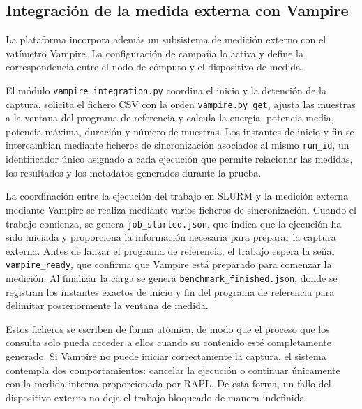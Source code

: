 \subsection{Integración de la medida externa con Vampire}
\label{subsec:vampire-implementacion}

La plataforma incorpora además un subsistema de medición externo con el vatímetro Vampire. La configuración de campaña lo activa y define la correspondencia entre el nodo de cómputo y el dispositivo de medida.

El módulo \texttt{vampire\_integration.py} coordina el inicio y la detención de la captura, solicita el fichero CSV con la orden \texttt{vampire.py get}, ajusta las muestras a la ventana del programa de referencia y calcula la energía, potencia media, potencia máxima, duración y número de muestras. Los instantes de inicio y fin se intercambian mediante ficheros de sincronización asociados al mismo \texttt{run\_id}, un identificador único asignado a cada ejecución que permite relacionar las medidas, los resultados y los metadatos generados durante la prueba.

La coordinación entre la ejecución del trabajo en SLURM y la medición externa mediante Vampire se realiza mediante varios ficheros de sincronización. Cuando el trabajo comienza, se genera \texttt{job\_started.json}, que indica que la ejecución ha sido iniciada y proporciona la información necesaria para preparar la captura externa. Antes de lanzar el programa de referencia, el trabajo espera la señal \texttt{vampire\_ready}, que confirma que Vampire está preparado para comenzar la medición. Al finalizar la carga se genera \texttt{benchmark\_finished.json}, donde se registran los instantes exactos de inicio y fin del programa de referencia para delimitar posteriormente la ventana de medida.

Estos ficheros se escriben de forma atómica, de modo que el proceso que los consulta solo pueda acceder a ellos cuando su contenido esté completamente generado. Si Vampire no puede iniciar correctamente la captura, el sistema contempla dos comportamientos: cancelar la ejecución o continuar únicamente con la medida interna proporcionada por RAPL. De esta forma, un fallo del dispositivo externo no deja el trabajo bloqueado de manera indefinida.

